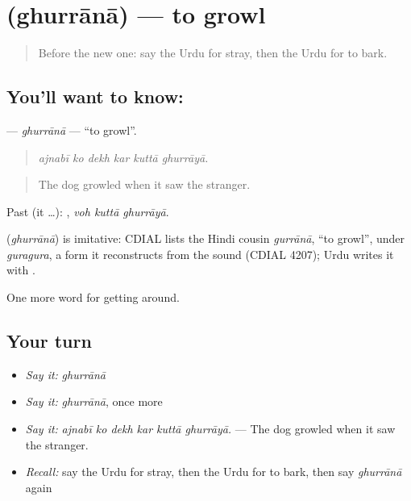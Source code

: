 \section[\texorpdfstring{\ur{غرانا} (ghurrānā)}{غرانا (ghurrānā)}]{ (ghurrānā) — to growl}

\label{lesson:UR-C414-ghurrana}



\begin{quote}
Before the new one: say the Urdu for stray, then the Urdu for to bark.
\end{quote}

\subsection*{You'll want to know: }
\textbf{} — \emph{ghurrānā} — \textquotedblleft{}to growl\textquotedblright{}.

\begin{quote}
     
\end{quote}

\begin{quote}
\emph{ajnabī ko dekh kar kuttā ghurrāyā.}
\end{quote}

\begin{quote}
The dog growled when it saw the stranger.
\end{quote}

Past (it …):   , \emph{voh kuttā ghurrāyā}.

\begin{cousinweb}
\textbf{} (\emph{ghurrānā}) is imitative: CDIAL lists the Hindi cousin \emph{gurrānā}, \textquotedblleft{}to growl\textquotedblright{}, under \emph{guragura}, a form it reconstructs from the sound (CDIAL 4207); Urdu writes it with \textbf{}.
\end{cousinweb}

\begin{grammarlens}[title={What you've built}]
One more word for getting around.
\end{grammarlens}

\subsection*{Your turn}
\begin{itemize}
\raggedright
  \item \emph{Say it:} \emph{ghurrānā}
  \item \emph{Say it:} \emph{ghurrānā}, once more
  \item \emph{Say it:} \emph{ajnabī ko dekh kar kuttā ghurrāyā.} — The dog growled when it saw the stranger.
  \item \emph{Recall:} say the Urdu for stray, then the Urdu for to bark, then say \emph{ghurrānā} again
\end{itemize}

